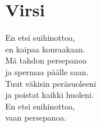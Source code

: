 \section{Virsi}
En etsi suihinottoa,\\
en kaipaa kouraakaan.\\
Mä tahdon persepanoa\\
ja spermaa päälle saan.\\
Tuut väkisin peräsuoleeni\\
ja poistat kaikki huoleni.\\
En etsi suihinottoa,\\
vaan persepanoa.